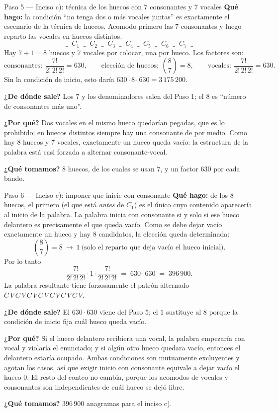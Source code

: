 \documentclass[11pt]{article}
\begin{document}
\begin{paso}{Paso 5 --- Inciso c): técnica de los huecos con 7 consonantes y 7 vocales}
\textbf{Qué hago:} la condición ``no tenga dos o más vocales juntas'' es exactamente el escenario de la
técnica de huecos. Acomodo primero las $7$ consonantes y luego reparto las vocales en huecos distintos.
\[
\_\;\;C_1\;\;\_\;\;C_2\;\;\_\;\;C_3\;\;\_\;\;C_4\;\;\_\;\;C_5\;\;\_\;\;C_6\;\;\_\;\;C_7\;\;\_
\]
Hay $7+1=8$ huecos y $7$ vocales por colocar, una por hueco. Los factores son:
\[
\text{consonantes}:\ \frac{7!}{2!\,2!\,2!}=630,\qquad
\text{elección de huecos}:\ \binom{8}{7}=8,\qquad
\text{vocales}:\ \frac{7!}{2!\,2!\,2!}=630 .
\]
Sin la condición de inicio, esto daría $630\cdot 8\cdot 630 = 3\,175\,200$.

\textbf{¿De dónde sale?} Los $7$ y los denominadores salen del Paso 1; el $8$ es ``número de consonantes más
uno''.

\textbf{¿Por qué?} Dos vocales en el mismo hueco quedarían pegadas, que es lo prohibido; en huecos distintos
siempre hay una consonante de por medio. Como hay $8$ huecos y $7$ vocales, exactamente un hueco queda vacío:
la estructura de la palabra está casi forzada a alternar consonante-vocal.

\textbf{¿Qué tomamos?} $8$ huecos, de los cuales se usan $7$, y un factor $630$ por cada bando.
\end{paso}

\begin{paso}{Paso 6 --- Inciso c): imponer que inicie con consonante}
\textbf{Qué hago:} de los $8$ huecos, el primero (el que está \emph{antes} de $C_1$) es el único cuyo
contenido aparecería al inicio de la palabra. La palabra inicia con consonante si y solo si ese hueco
delantero es precisamente el que queda vacío. Como se debe dejar vacío exactamente un hueco y hay $8$
candidatos, la elección queda determinada:
\[
\binom{8}{7} = 8 \ \longrightarrow\ 1 \ \text{(solo el reparto que deja vacío el hueco inicial)} .
\]
Por lo tanto
\[
\frac{7!}{2!\,2!\,2!}\cdot 1\cdot \frac{7!}{2!\,2!\,2!} \;=\; 630\cdot 630 \;=\; 396\,900 .
\]
La palabra resultante tiene forzosamente el patrón alternado
$C\,V\,C\,V\,C\,V\,C\,V\,C\,V\,C\,V\,C\,V$.

\textbf{¿De dónde sale?} El $630\cdot 630$ viene del Paso 5; el $1$ sustituye al $8$ porque la condición de
inicio fija cuál hueco queda vacío.

\textbf{¿Por qué?} Si el hueco delantero recibiera una vocal, la palabra empezaría con vocal y violaría el
enunciado; y si algún otro hueco quedara vacío, entonces el delantero estaría ocupado. Ambas condiciones son
mutuamente excluyentes y agotan los casos, así que exigir inicio con consonante equivale a dejar vacío el
hueco $0$. El resto del conteo no cambia, porque los acomodos de vocales y consonantes son independientes de
cuál hueco se dejó libre.

\textbf{¿Qué tomamos?} $396\,900$ anagramas para el inciso c).
\end{paso}
\end{document}
